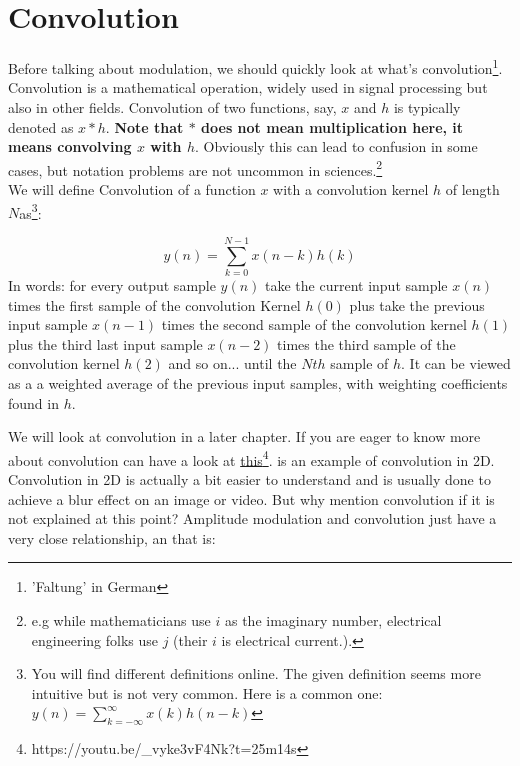 \section{Convolution}
\label{sub:conv}
Before talking about modulation, we should quickly look at what's convolution\footnote{'Faltung' in German}.\\
Convolution is a mathematical operation, widely used in signal processing but also in other fields. Convolution of two functions, say, $x$ and $h$ is typically denoted as $x*h$. \textbf{Note that $*$ does not mean multiplication here, it means convolving $x$ with $h$}. Obviously this can lead to confusion in some cases, but notation problems are not uncommon in sciences.\footnote{e.g while mathematicians use $i$ as the imaginary number, electrical engineering folks use $j$ (their $i$ is electrical current.).}\\

We will define Convolution of a function $x$ with a convolution kernel $h$ of length $N$as\footnote{You will find different definitions online. The given definition seems more intuitive but is not very common. Here is a common one:$y(n) = \sum_{k=-\infty}^{\infty} x(k) h (n-k)$}:

\begin{equation}
y(n) = \sum_{k=0}^{N-1} x(n-k) h (k)
\end{equation}
In words: for every output sample $y(n)$ take the current input sample $x(n)$ times the first sample of the convolution Kernel $h(0)$ plus take the previous input sample $x(n-1)$ times the second sample of the convolution kernel $h(1)$ plus the third last input sample $x(n-2)$ times the third sample of the convolution kernel $h(2)$ and so on... until the $Nth$ sample of $h$. It can be viewed as a a weighted average of the previous input samples, with weighting coefficients found in $h$.

We will look at convolution in a later chapter. If you  are eager to know more about convolution can have a look at
\href{https://youtu.be/_vyke3vF4Nk?t=25m14s}{this}\footnote{https://youtu.be/\_vyke3vF4Nk?t=25m14s}.  is an example of convolution in 2D. Convolution in 2D is actually a bit easier to understand and is usually done to achieve a blur effect on an image or video. But why mention convolution if it is not explained at this point? Amplitude modulation and convolution just have a very close relationship, an that is:



